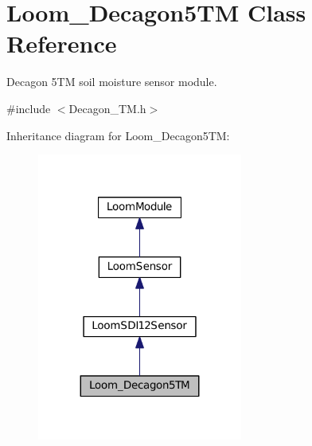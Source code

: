 \hypertarget{class_loom___decagon5_t_m}{}\section{Loom\+\_\+\+Decagon5\+TM Class Reference}
\label{class_loom___decagon5_t_m}


Decagon 5\+TM soil moisture sensor module.  




{\ttfamily \#include $<$Decagon\+\_\+T\+M.\+h$>$}



Inheritance diagram for Loom\+\_\+\+Decagon5\+TM\+:\nopagebreak
\begin{figure}[H]
\begin{center}
\leavevmode
\includegraphics[width=191pt]{class_loom___decagon5_t_m__inherit__graph}
\end{center}
\end{figure}
